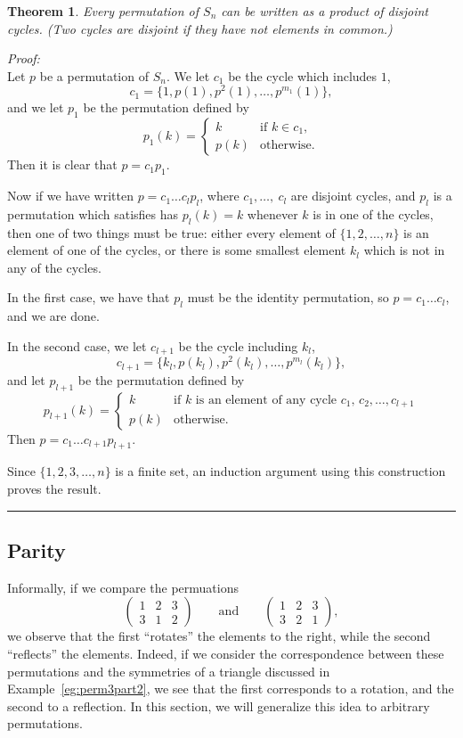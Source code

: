 \documentclass[10pt]{book}
\theoremstyle{break}
\newtheorem{theorem}{Theorem}[section]
\newenvironment{proof}[1][]%
{\par\noindent\textit{Proof\ifthenelse{\equal{#1}{}}{}{
(#1)}:}\\\hspace*{\parindent}}%
{\hfill\rule{2ex}{2ex}\par\vspace{\theorempostskipamount}}
\begin{document}
\begin{theorem}
  Every permutation of $S_{n}$ can be written as a product of disjoint cycles.
  (Two cycles are disjoint if they have not elements in common.)
\end{theorem}
\begin{proof}
  Let $p$ be a permutation of $S_{n}$.  We let $c_{1}$ be the cycle which
  includes $1$,
  \[
    c_{1} = \{1, p(1), p^{2}(1), \ldots, p^{m_{1}}(1)\},
  \]
  and we let $p_{1}$ be the permutation defined by
  \[
    p_{1}(k) = \begin{cases}
      k & \text{if $k \in c_{1}$,}\\
      p(k) & \text{otherwise}.
    \end{cases}
  \]
  Then it is clear that $p = c_{1}p_{1}$.
  
  Now if we have written $p = c_{1}\ldots c_{l}p_{l}$, where $c_{1}, \ldots,\
  c_{l}$ are disjoint cycles, and $p_{l}$ is a permutation which satisfies
  has $p_{l}(k) = k$ whenever $k$ is in one of the cycles, then one of two
  things must be true: either every element of $\{1, 2, \ldots, n\}$ is an
  element of one of the cycles, or there is some smallest element $k_{l}$
  which is not in any of the cycles.
  
  In the first case, we have that $p_{l}$ must be the identity permutation,
  so $p = c_{1}\ldots c_{l}$, and we are done.
  
  In the second case, we let $c_{l+1}$ be the cycle including $k_{l}$,
  \[
    c_{l+1} = \{k_{l}, p(k_{l}), p^{2}(k_{l}), \ldots, p^{m_{l}}(k_{l})\},
  \]
  and let $p_{l+1}$ be the permutation defined by
  \[
    p_{l+1}(k) = \begin{cases}
      k & \text{if $k$ is an element of any cycle $c_{1}$, $c_{2}, \ldots, c_{l+1}$}\\
      p(k) & \text{otherwise}.
    \end{cases}
  \]
  Then $p = c_{1}\ldots c_{l+1}p_{l+1}$.
  
  Since $\{1,2,3,\ldots, n\}$ is a finite set, an induction argument using
  this construction proves the result.
\end{proof}

\subsection{Parity}

Informally, if we compare the permuations
\[
  \begin{pmatrix}
    1 & 2 & 3\\
    3 & 1 & 2
  \end{pmatrix}
  \qquad \text{and} \qquad
  \begin{pmatrix}
    1 & 2 & 3\\
    3 & 2 & 1
  \end{pmatrix},
\]
we observe that the first ``rotates'' the elements to the right, while
the second ``reflects'' the elements.  Indeed, if we consider the
correspondence between these permutations and the symmetries of a triangle
discussed in Example~\ref{eg:perm3part2}, we see that the first corresponds
to a rotation, and the second to a reflection.  In this section, we will
generalize this idea to arbitrary permutations.
\end{document}
